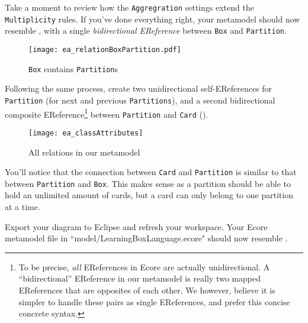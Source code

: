 \begin{stepbystep}
\item Take a moment to review how the \texttt{Aggregration} settings extend the \texttt{Multiplicity} rules. If you've done everything
right, your metamodel should now resemble , with a single \emph{bidirectional EReference} between \texttt{Box} and
\texttt{Partition}.

\vspace{1cm}

\begin{figure}[htbp]
	\centering
  \texttt{[image: ea\_relationBoxPartition.pdf]}
	\caption{\texttt{Box} contains \texttt{Partition}s}
	\label{ea:ereference_completed}
\end{figure}
\FloatBarrier

\item Following the same process, create two unidirectional self-EReferences for \texttt{Partition} (for next and previous \texttt{Partitions}), and a second bidirectional composite
EReference\footnote{To be precise, \emph{all} EReferences in Ecore are actually unidirectional. A ``bidirectional'' EReference in our metamodel is really two
mapped EReferences that are opposites of each other. We however, believe it is simpler to handle these pairs as single EReferences, and prefer this
concise concrete syntax.} between \texttt{Partition} and \texttt{Card} (). 

\vspace{1cm}

\begin{figure}[htbp]
	\centering
  \texttt{[image: ea\_classAttributes]}
	\caption{All relations in our metamodel}
	\label{ea:ereferences_all}
\end{figure}
\FloatBarrier

\vspace{1cm}

\item You'll notice that the connection between \texttt{Card} and \texttt{Partition} is similar to that between \texttt{Partition} and
\texttt{Box}. This makes sense as a partition should be able to hold an unlimited amount of cards, but a card can only belong to one partition at a time.

\vspace{1cm}

\item Export your diagram to Eclipse and refresh your workspace. Your Ecore metamodel file in ``model/LearningBoxLanguage.ecore" should now resemble .


\end{stepbystep}
